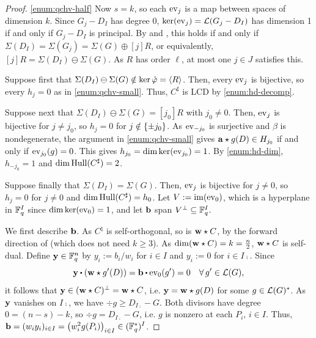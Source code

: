 \documentclass[twocolumn, 11pt]{scrartcl}
\begin{document}
\begin{proof}
    \ref{enum:qchv-half} Now $s=k$, so each $\ev_j$ is a map between spaces of dimension $k$. Since $G_j-D_I$ has degree 0, $\ker(\ev_j)=\mcL(G_j-D_I)$ has dimension 1 if and only if $G_j-D_I$ is principal. By  and , this holds if and only if $\Sigma(D_I)=\Sigma(G_j)=\Sigma(G)\oplus[j]R$, or equivalently, $[j]R=\Sigma(D_I)\ominus\Sigma(G)$. As $R$ has order $\ell$, at most one $j\in J$ satisfies this.

    Suppose first that $\Sigma(D_I)\ominus\Sigma(G)\notin\ker\hat\varphi=\ang R$. Then, every $\ev_j$ is bijective, so every $h_j=0$ as in \ref{enum:qchv-small}. Thus, $C^\sharp$ is LCD by \ref{enum:hd-decomp}.

    Suppose next that $\Sigma(D_I)\ominus\Sigma(G)=[j_0]R$ with $j_0\neq0$. Then, $\ev_j$ is bijective for $j\neq j_0$, so $h_j=0$ for $j\notin\set{\pm j_0}$. As $\ev_{-j_0}$ is surjective and $\beta$ is nondegenerate, the argument in \ref{enum:qchv-small} gives $\bfa\star g(D)\in H_{j_0}$ if and only if $\ev_{j_0}(g)=0$. This gives $h_{j_0}=\dim\ker(\ev_{j_0})=1$. By \ref{enum:hd-dim}, $h_{-j_0}=1$ and $\dim\Hull(C^\sharp)=2$.

    Suppose finally that $\Sigma(D_I)=\Sigma(G)$. Then, $\ev_j$ is bijective for $j\neq 0$, so $h_j=0$ for $j\neq0$ and $\dim\Hull(C^\sharp)=h_0$. Let $V:=\im(\ev_0)$, which is a hyperplane in $\bbF_q^I$ since $\dim\ker(\ev_0)=1$, and let $\bfb$ span $V^\perp\subseteq\bbF_q^I$.

    We first describe $\bfb$. As $C^\natural$ is self-orthogonal, so is $\bfw\star C$, by the forward direction of  (which does not need $k\geq3$). As $\dim(\bfw\star C)=k=\frac n2$, $\bfw\star C$ is self-dual. Define $\bfy\in\bbF_q^n$ by $y_i:=b_i/w_i$ for $i\in I$ and $y_i:=0$ for $i\in I\comp$. Since 
    \[ \bfy\dotpr(\bfw\star g'(D))=\bfb\dotpr\ev_0(g')=0 \quad\forall g'\in\mcL(G), \]
    it follows that $\bfy\in(\bfw\star C)^\perp=\bfw\star C$, i.e. $\bfy=\bfw\star g(D)$ for some $g\in\mcL(G)^*$. As $\bfy$ vanishes on $I\comp$, we have $\div g\geq D_{I\comp}-G$. Both divisors have degree $0=(n-s)-k$, so $\div g=D_{I\comp}-G$, i.e. $g$ is nonzero at each $P_i$, $i\in I$. Thus, $\bfb=(w_iy_i)_{i\in I}=\pa[\big]{w_i^2g(P_i)}_{i\in I}\in(\bbF_q^*)^I$.
    

\end{proof}
\end{document}
